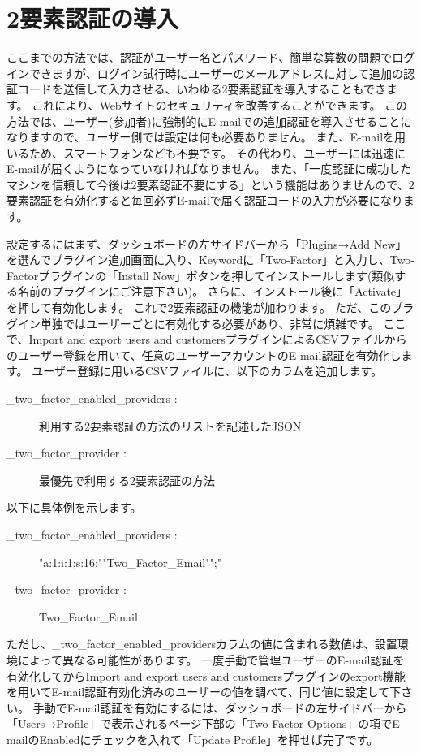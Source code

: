 \documentclass[titlepage,10pt,a4paper,uplatex]{jsbook}
\begin{document}
\section{2要素認証の導入}

ここまでの方法では、認証がユーザー名とパスワード、簡単な算数の問題でログインできますが、ログイン試行時にユーザーのメールアドレスに対して追加の認証コードを送信して入力させる、いわゆる2要素認証を導入することもできます。
これにより、Webサイトのセキュリティを改善することができます。
この方法では、ユーザー(参加者)に強制的にE-mailでの追加認証を導入させることになりますので、ユーザー側では設定は何も必要ありません。
また、E-mailを用いるため、スマートフォンなども不要です。
その代わり、ユーザーには迅速にE-mailが届くようになっていなければなりません。
また、「一度認証に成功したマシンを信頼して今後は2要素認証不要にする」という機能はありませんので、2要素認証を有効化すると毎回必ずE-mailで届く認証コードの入力が必要になります。

設定するにはまず、ダッシュボードの左サイドバーから「Plugins→Add New」を選んでプラグイン追加画面に入り、Keywordに「Two-Factor」と入力し、Two-Factorプラグインの「Install Now」ボタンを押してインストールします(類似する名前のプラグインにご注意下さい)。
さらに、インストール後に「Activate」を押して有効化します。
これで2要素認証の機能が加わります。
ただ、このプラグイン単独ではユーザーごとに有効化する必要があり、非常に煩雑です。
ここで、Import and export users and customersプラグインによるCSVファイルからのユーザー登録を用いて、任意のユーザーアカウントのE-mail認証を有効化します。
ユーザー登録に用いるCSVファイルに、以下のカラムを追加します。

\begin{description}
\item[\_two\_factor\_enabled\_providers : ] 利用する2要素認証の方法のリストを記述したJSON
\item[\_two\_factor\_provider : ] 最優先で利用する2要素認証の方法
\end{description}

以下に具体例を示します。

\begin{description}
\item[\_two\_factor\_enabled\_providers : ] "a:1:{i:1;s:16:""Two\_Factor\_Email"";}"
\item[\_two\_factor\_provider : ] Two\_Factor\_Email
\end{description}

ただし、\_two\_factor\_enabled\_providersカラムの値に含まれる数値は、設置環境によって異なる可能性があります。
一度手動で管理ユーザーのE-mail認証を有効化してからImport and export users and customersプラグインのexport機能を用いてE-mail認証有効化済みのユーザーの値を調べて、同じ値に設定して下さい。
手動でE-mail認証を有効にするには、ダッシュボードの左サイドバーから「Users→Profile」で表示されるページ下部の「Two-Factor Options」の項でE-mailのEnabledにチェックを入れて「Update Profile」を押せば完了です。
\end{document}
